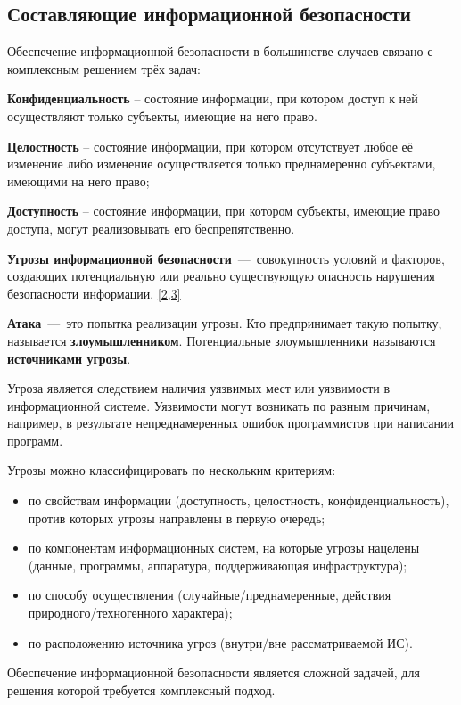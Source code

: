 \subsection{Составляющие информационной безопасности}%
Обеспечение информационной безопасности в большинстве случаев связано с
комплексным решением трёх задач:
\begin{Notes}
  \item \textbf{Конфиденциальность} – состояние информации, при котором
      доступ к ней осуществляют только субъекты, имеющие на него право.
  \item \textbf{Целостность} – состояние информации, при котором
      отсутствует любое её изменение либо изменение осуществляется только
      преднамеренно субъектами, имеющими на него право;
  \item \textbf{Доступность} – состояние информации, при котором субъекты,
      имеющие право доступа, могут реализовывать его беспрепятственно.
\end{Notes}

\textbf{Угрозы информационной безопасности}~---~совокупность условий и
факторов, создающих потенциальную или реально существующую опасность
нарушения безопасности информации.
\href{https://www.intuit.ru/studies/courses/697/553/literature#literature.1}{[2,3]}

\textbf{Атака}~---~это попытка реализации угрозы. Кто предпринимает такую
попытку, называется \textbf{злоумышленником}. Потенциальные злоумышленники
называются \textbf{источниками угрозы}.

Угроза является следствием наличия уязвимых мест или уязвимости в
информационной системе. Уязвимости могут возникать по разным причинам,
например, в результате непреднамеренных ошибок программистов при написании
программ.

\noindent Угрозы можно классифицировать по нескольким критериям:
\begin{itemize}
  \item по свойствам информации (доступность, целостность,
      конфиденциальность), против которых угрозы направлены в первую
      очередь;
  \item по компонентам информационных систем, на которые угрозы нацелены
      (данные, программы, аппаратура, поддерживающая инфраструктура);
  \item по способу осуществления (случайные/преднамеренные, действия
      природного/техногенного характера);
  \item по расположению источника угроз (внутри/вне рассматриваемой ИС).
\end{itemize}
Обеспечение информационной безопасности является сложной задачей, для решения
которой требуется комплексный подход.

